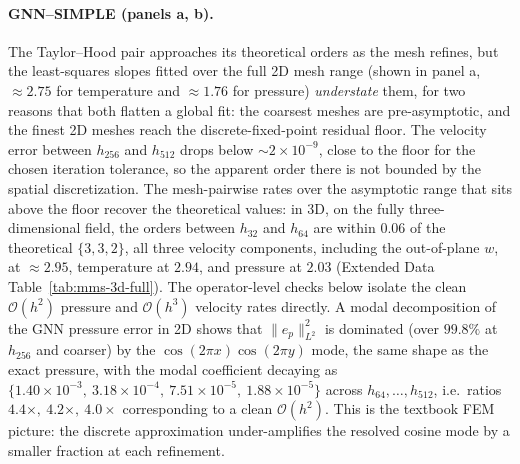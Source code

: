 \paragraph{GNN--SIMPLE (panels a, b).} The Taylor--Hood pair approaches its
theoretical orders as the mesh refines, but the least-squares slopes fitted over
the full 2D mesh range (shown in panel a, $\approx\!2.75$ for temperature and
$\approx\!1.76$ for pressure) \emph{understate} them, for two reasons that both
flatten a global fit: the coarsest meshes are pre-asymptotic, and the finest 2D
meshes reach the discrete-fixed-point residual floor. The velocity error between
$h_{256}$ and $h_{512}$ drops below $\sim\!2\times 10^{-9}$, close to the floor for
the chosen iteration tolerance, so the apparent order there is not bounded by the
spatial discretization. The mesh-pairwise rates over the asymptotic range that sits
above the floor recover the theoretical values: in 3D, on the fully three-dimensional
field, the orders between $h_{32}$ and $h_{64}$ are within $0.06$ of the theoretical
$\{3, 3, 2\}$, all three velocity components, including the out-of-plane $w$, at
$\approx\!2.95$, temperature at $2.94$, and pressure at $2.03$
(Extended Data Table~\ref{tab:mms-3d-full}). The operator-level checks below isolate the clean
$\mathcal{O}(h^{2})$ pressure and $\mathcal{O}(h^{3})$ velocity rates directly. A modal decomposition of the GNN pressure
error in 2D shows that $\|e_{p}\|_{L^{2}}^{2}$ is dominated (over $99.8\%$
at $h_{256}$ and coarser) by the $\cos(2\pi x)\cos(2\pi y)$ mode, the same
shape as the exact pressure, with the modal coefficient decaying as
$\{1.40\times 10^{-3},\ 3.18\times 10^{-4},\ 7.51\times 10^{-5},\
1.88\times 10^{-5}\}$ across $h_{64},\ldots,h_{512}$, i.e.\ ratios
$4.4\times,\ 4.2\times,\ 4.0\times$ corresponding to a clean
$\mathcal{O}(h^{2})$. This is the textbook FEM picture: the discrete
approximation under-amplifies the resolved cosine mode by a smaller
fraction at each refinement.
